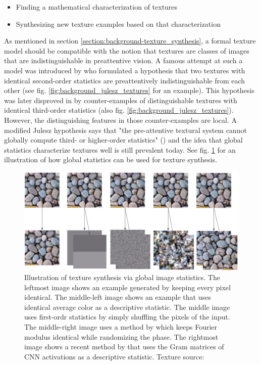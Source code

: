 \begin{itemize}
    \item Finding a mathematical characterization of textures
    \item Synthesizing new texture examples based on that characterization
\end{itemize}

As mentioned in section \ref{section:background-texture_synthesis}, a formal texture model should be compatible with the notion that textures are classes of images that are indistinguishable in preattentive vision. A famous attempt at such a model was introduced by \citet{Julesz1962} who formulated a hypothesis that two textures with identical second-order statistics are preattentively indistinguishable from each other (see fig. \ref{fig:background_julesz_textures} for an example). This hypothesis was later disproved in \citet{Julesz1973} by counter-examples of distinguishable textures with identical third-order statistics (also fig. \ref{fig:background_julesz_textures}). However, the distinguishing features in those counter-examples are local. A modified Julesz hypothesis says that "the pre-attentive textural system cannot globally compute third- or higher-order statistics" (\citet{Julesz1981}) and the idea that global statistics characterize textures well is still prevalent today. See fig. \ref{fig:background_statistics_example} for an illustration of how global statistics can be used for texture synthesis.

\begin{figure}[ht]
    \centering
    \includegraphics[width=\textwidth]{images/02-statistics_example_compressed.jpg}
    \caption{Illustration of texture synthesis via global image statistics. The leftmost image shows an example generated by keeping every pixel identical. The middle-left image shows an example that uses identical average color as a descriptive statistic. The middle image uses first-ordr statistics by simply shuffling the pixels of the input. The middle-right image uses a method by \citet{Galerne2011} which keeps Fourier modulus identical while randomizing the phase. The rightmost image shows a recent method by \citet{Gatys2015} that uses the Gram matrices of CNN activations as a descriptive statistic. Texture source: \citet{Gatys2015}}
    \label{fig:background_statistics_example}
\end{figure}


